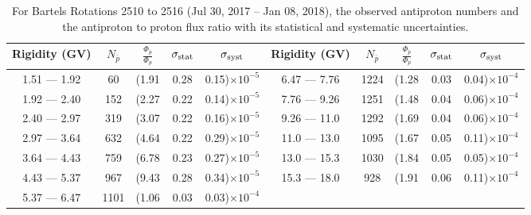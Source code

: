 \begin{table}[p] 
\renewcommand\baselinestretch{1.3}\selectfont
\setlength\tabcolsep{3pt}
\centering
\begin{tabular}{ccccc | ccccc}
\hline
\textbf{Rigidity}  (GV)  & $N_{\bar{p}}$ & $\frac{\Phi_{\bar{p}}}{\Phi_{p}}$ & $\sigma_{\rm{stat}}$ & $\sigma_{\rm{syst}}$ \hspace{1cm}   & \textbf{Rigidity}  (GV)  & $N_{\bar{p}}$ & $\frac{\Phi_{\bar{p}}}{\Phi_{p}}$ & $\sigma_{\rm{stat}}$ & $\sigma_{\rm{syst}}$ \hspace{1cm} \\ 
\hline
1.51 — 1.92   &  60                  &(1.91                          &  0.28              &      0.15)$\times 10^{-5}$  & 6.47 — 7.76                &  1224                    &(1.28                                &  0.03                   &      0.04)$\times 10^{-4}$\\
1.92 — 2.40   &  152                &(2.27                          &  0.22              &      0.14)$\times 10^{-5}$  & 7.76 — 9.26                &  1251                    &(1.48                                &  0.04                   &      0.06)$\times 10^{-4}$\\
2.40 — 2.97   &  319                &(3.07                          &  0.22              &      0.16)$\times 10^{-5}$  & 9.26 — 11.0                &  1292                    &(1.69                                &  0.04                   &      0.06)$\times 10^{-4}$\\    
2.97 — 3.64   &  632                &(4.64                          &  0.22              &      0.29)$\times 10^{-5}$  & 11.0 — 13.0                 &  1095                    &(1.67                                &  0.05                   &      0.11)$\times 10^{-4}$\\    
3.64 — 4.43   &  759                &(6.78                          &  0.23              &      0.27)$\times 10^{-5}$  & 13.0 — 15.3               &  1030                    &(1.84                                &  0.05                   &      0.05)$\times 10^{-4}$\\
4.43 — 5.37   &  967                &(9.43                          &  0.28              &      0.34)$\times 10^{-5}$  & 15.3 — 18.0               &  928                      &(1.91                                &  0.06                   &      0.11)$\times 10^{-4}$\\
5.37 — 6.47   &  1101              &(1.06                          &  0.03              &      0.03)$\times 10^{-4}$  & \\
\hline
\end{tabular}
\caption[Antiproton to proton flux ratio for Bartels Rotations 2510 to 2516]{For Bartels Rotations 2510 to 2516 (Jul 30, 2017 – Jan 08, 2018), the observed antiproton numbers and the antiproton to proton flux ratio with its statistical and systematic uncertainties.}
\label{TableOfDependent15}
\end{table}

